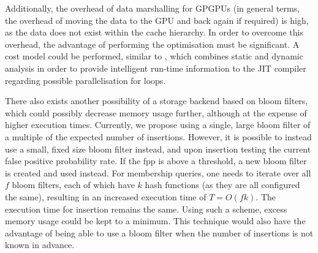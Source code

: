 Additionally, the overhead of data marshalling for GPGPUs (in general terms, the overhead of moving the data to the GPU and back again if required) is high, as the data does not exist within the cache hierarchy. In order to overcome this overhead, the advantage of performing the optimisation must be significant. A cost model could be performed, similar to \citet{Tournavitis2009}, which combines static and dynamic analysis in order to provide intelligent run-time information to the JIT compiler regarding possible parallelisation for loops.

There also exists another possibility of a storage backend based on bloom filters, which could possibly decrease memory usage further, although at the expense of higher execution times. Currently, we propose using a single, large bloom filter of a multiple of the expected number of insertions. However, it is possible to instead use a small, fixed size bloom filter instead, and upon insertion testing the current false positive probability rate. If the fpp is above a threshold, a new bloom filter is created and used instead. For membership queries, one needs to iterate over all $f$ bloom filters, each of which have $k$ hash functions (as they are all configured the same), resulting in an increased execution time of $T=O(fk)$. The execution time for insertion remains the same. Using such a scheme, excess memory usage could be kept to a minimum. This technique would also have the advantage of being able to use a bloom filter when the number of insertions is not known in advance.